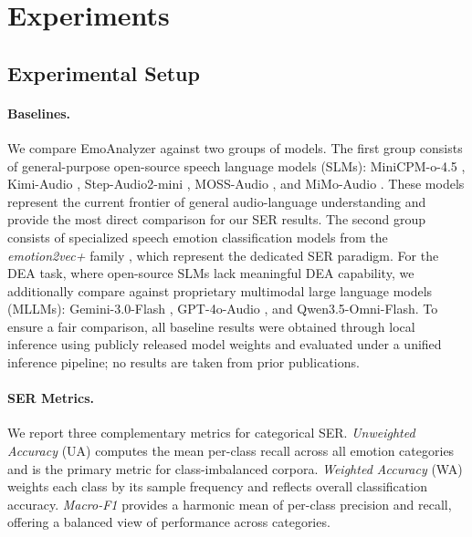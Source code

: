 \section{Experiments}

\subsection{Experimental Setup}
\label{sec:setup}

\paragraph{Baselines.}
We compare EmoAnalyzer against two groups of models. The first group consists of general-purpose open-source speech language models (SLMs): MiniCPM-o-4.5 \cite{MiniCPM-o-4.5}, Kimi-Audio \cite{Kimi-Audio}, Step-Audio2-mini \cite{Step-Audio2}, MOSS-Audio \cite{MOSS-Audio}, and MiMo-Audio \cite{Mimo-Audio}. These models represent the current frontier of general audio-language understanding and provide the most direct comparison for our SER results. The second group consists of specialized speech emotion classification models from the \textit{emotion2vec+} family \cite{emotion2vec}, which represent the dedicated SER paradigm. For the DEA task, where open-source SLMs lack meaningful DEA capability, we additionally compare against proprietary multimodal large language models (MLLMs): Gemini-3.0-Flash \cite{gemini3}, GPT-4o-Audio \cite{GPT-4o}, and Qwen3.5-Omni-Flash. To ensure a fair comparison, all baseline results were obtained through local inference using publicly released model weights and evaluated under a unified inference pipeline; no results are taken from prior publications.

\paragraph{SER Metrics.}
We report three complementary metrics for categorical SER. \textit{Unweighted Accuracy} (UA) computes the mean per-class recall across all emotion categories and is the primary metric for class-imbalanced corpora. \textit{Weighted Accuracy} (WA) weights each class by its sample frequency and reflects overall classification accuracy. \textit{Macro-F1} provides a harmonic mean of per-class precision and recall, offering a balanced view of performance across categories.


